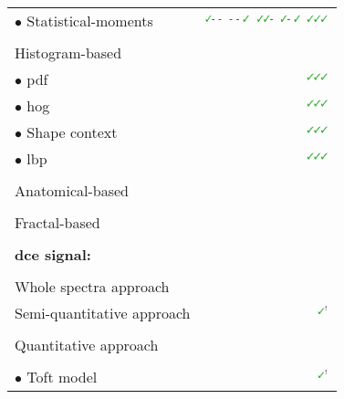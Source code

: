\begin{table}
\begin{tabular}{l r}
  \quad \quad \quad $\bullet$ Statistical-moments & $^{\text{{\cmarksmall}- -}}$\cite{Ampeliotis2007,Ampeliotis2008,Tiwari2009a,Tiwari2010,Tiwari2013,Viswanath2008,Viswanath2009,Viswanath2012,rampun2016quantitative,rampun2015computer,rampun2016computer} $^{\text{- - {\cmarksmall}}}$\cite{Antic2013} $^{\text{{\cmarksmall}{\cmarksmall}-}}$\cite{Viswanath2011} $^{\text{{\cmarksmall}- {\cmarksmall}}}$\cite{Peng2013,cameron2014multiparametric,cameron2016maps,khalvati2015automated,chung2015prostate} $^{\text{{\cmarksmall}{\cmarksmall}{\cmarksmall}}}$\cite{Litjens2011,Litjens2012,Litjens2014,Niaf2011,Niaf2012,lehaire2014computer} \\ \\ [-1.5ex]
  \quad \quad Histogram-based & \\
  \quad \quad \quad $\bullet$ \acs{pdf} & $^{\text{{\cmarksmall}{\cmarksmall}{\cmarksmall}}}$\cite{Liu2013} \\
  \quad \quad \quad $\bullet$ \acs{hog} & $^{\text{{\cmarksmall}{\cmarksmall}{\cmarksmall}}}$\cite{Liu2013} \\
  \quad \quad \quad $\bullet$ Shape context & $^{\text{{\cmarksmall}{\cmarksmall}{\cmarksmall}}}$\cite{Liu2013} \\
  \quad \quad \quad $\bullet$ \acs{lbp} & $^{\text{{\cmarksmall}{\cmarksmall}{\cmarksmall}}}$\cite{Liu2013} \\ \\ [-1.5ex]
  \quad \quad Anatomical-based & \cite{Litjens2012,Litjens2014,Matulewicz2013,cameron2014multiparametric,cameron2016maps} \\ \\ [-1.5ex]
  \quad \quad Fractal-based & \cite{Lopes2011,Lv2009} \\ \\ [-1.5ex]
  \textbf{\acs*{dce} signal:} & \\ \\ [-1.5ex]
  \quad Whole spectra approach & \cite{Ampeliotis2007,Ampeliotis2008} \\
  \quad Semi-quantitative approach & $^{\text{{\mmarksmall}}}$\cite{Puech2009} \cite{Mazzetti2011,Niaf2011,Niaf2012,Sung2011,trigui2016classification,trigui2017automatic,lehaire2014computer,samarasinghe2016semi,giannini2015fully} \\ \\ [-1.5ex]
  \quad Quantitative approach &  \\ \\ [-1.5ex]
  \quad \quad $\bullet$ Toft model & $^{\text{{\mmarksmall}}}$\cite{Liu2013,Peng2013} \cite{Giannini2013,Langer2009,Litjens2011,Litjens2012,Litjens2014,Mazzetti2011,Niaf2011,Niaf2012,lehaire2014computer,giannini2015fully} \\

\end{tabular}
\end{table}
